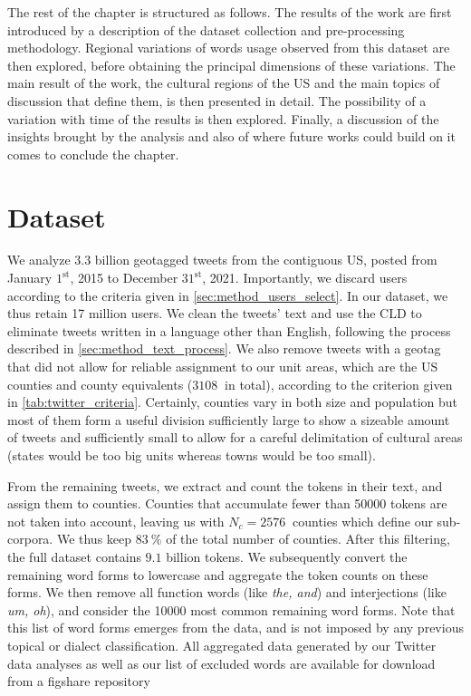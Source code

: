 \documentclass[../thesis.tex]{subfiles}
\begin{document}
The rest of the chapter is structured as follows.
The results of the work are first
introduced by a description of the dataset collection and pre-processing methodology.
Regional variations of words usage observed from this dataset are then explored, before
obtaining the principal dimensions of these variations. The main result of the work, the
cultural regions of the US and the main topics of discussion that define them, is then
presented in detail. The possibility of a variation with time of the results is then
explored. Finally, a discussion of the insights brought by the analysis and also of
where future works could build on it comes to conclude the chapter.


\section{Dataset}
We analyze 3.3 billion geotagged tweets from the contiguous US, posted from January
$1^\text{st}$, 2015 to December $31^\text{st}$, 2021. Importantly, we discard users
according to the criteria given in \cref{sec:method_users_select}. In our dataset, we
thus retain 17 million users. We clean the tweets' text and use the \ac{CLD} to
eliminate tweets written in a language other than English, following the process
described in \cref{sec:method_text_process}. We also remove tweets with a geotag that
did not allow for reliable assignment to our unit areas, which are the US counties and
county equivalents ($\SI{3108}{}$ in total), according to the criterion given in
\cref{tab:twitter_criteria}. Certainly, counties vary in both size and population but
most of them form a useful division sufficiently large to show a sizeable amount of
tweets and sufficiently small to allow for a careful delimitation of cultural areas
(states would be too big units whereas towns would be too small).

From the remaining tweets, we extract and count the tokens in their text, and assign
them to counties. Counties that accumulate fewer than \SI{50000}{} tokens are not taken
into account, leaving us with $N_c = \SI{2576}{}$ counties which define our sub-corpora.
We thus keep $\SI{83}{\percent}$ of the total number of counties. After this filtering,
the full dataset contains $9.1$ billion tokens. We subsequently convert the remaining
word forms to lowercase and aggregate the token counts on these forms. We then remove
all function words (like \textit{the, and}) and interjections (like \textit{um, oh}), and consider the
\SI{10000}{} most common remaining word forms. Note that this list of word forms emerges
from the data, and is not imposed by any previous topical or dialect classification.
All aggregated data generated by our Twitter data analyses as well as our list of
excluded words are available for download from a figshare repository
\cite{LoufWordCounts2023}
\end{document}
